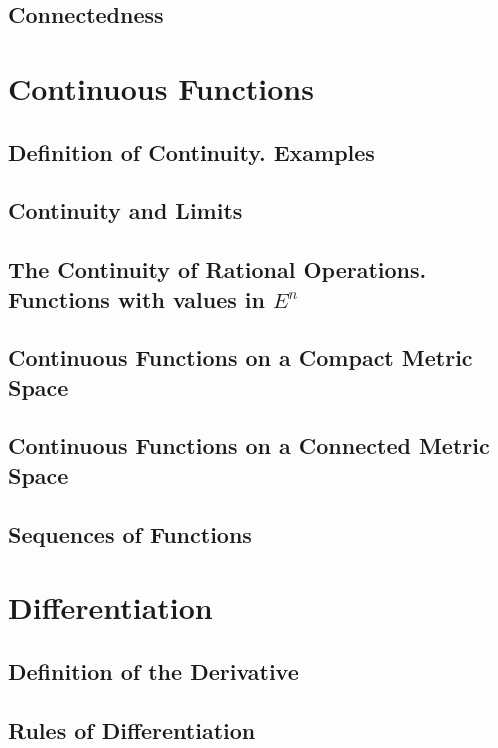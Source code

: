 \documentclass{article}
\begin{document}
		\subsection{Connectedness}
	
	\section{Continuous Functions}
		\subsection{Definition of Continuity. Examples}
		
		\subsection{Continuity and Limits}
		
		\subsection{The Continuity of Rational Operations. Functions with values in $E^n$}
		
		\subsection{Continuous Functions on a Compact Metric Space}
		
		\subsection{Continuous Functions on a Connected Metric Space}
		
		\subsection{Sequences of Functions}
	
	\section{Differentiation}
		\subsection{Definition of the Derivative}
		
		\subsection{Rules of Differentiation}		
		
\end{document}

